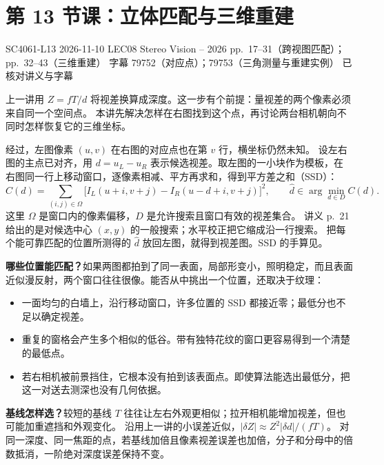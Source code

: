 \section{第 13 节课：立体匹配与三维重建}
\label{lecture:SC4061-L13}

\lecturemeta
  {SC4061-L13}
  {2026-11-10}
  {LEC08 Stereo Vision -- 2026}
  {pp.~17--31（跨视图匹配）；pp.~32--43（三维重建）}
  {字幕 79752（对应点）；79753（三角测量与重建实例）}
  {已核对讲义与字幕}

上一讲用 $Z=fT/d$ 将视差换算成深度。这一步有个前提：量视差的两个像素必须来自同一个空间点。
本讲先解决怎样在右图找到这个点，再讨论两台相机朝向不同时怎样恢复它的三维坐标。


经过，左图像素 $(u,v)$ 在右图的对应点也在第 $v$ 行，横坐标仍然未知。
设左右图的主点已对齐，用 $d=u_L-u_R$ 表示候选视差。取左图的一小块作为模板，在右图同一行上移动窗口，逐像素相减、平方再求和，得到平方差之和（SSD）：
\[
 C(d)=\sum_{(i,j)\in\Omega}
 \big[I_L(u+i,v+j)-I_R(u-d+i,v+j)\big]^2,
 \qquad \hat d\in\arg\min_{d\in D} C(d).
\]
这里 $\Omega$ 是窗口内的像素偏移，$D$ 是允许搜索且窗口有效的视差集合。
讲义 p.~21 给出的是对候选中心 $(x,y)$ 的一般搜索；水平校正把它缩成沿一行搜索。
把每个能可靠匹配的位置所测得的 $\hat d$ 放回左图，就得到视差图。SSD 的手算见。

\textbf{哪些位置能匹配？}如果两图都拍到了同一表面，局部形变小，照明稳定，而且表面近似漫反射，两个窗口往往很像。能否从中挑出一个位置，还取决于纹理：
\begin{itemize}
  \item 一面均匀的白墙上，沿行移动窗口，许多位置的 SSD 都接近零；最低分也不足以确定视差。
  \item 重复的窗格会产生多个相似的低谷。带有独特花纹的窗口更容易得到一个清楚的最低点。
  \item 若右相机被前景挡住，它根本没有拍到该表面点。即使算法能选出最低分，把这一对送去测深也没有几何依据。
\end{itemize}

\textbf{基线怎样选？}较短的基线 $T$ 往往让左右外观更相似；拉开相机能增加视差，但也可能加重遮挡和外观变化。
沿用上一讲的小误差近似，$|\delta Z|\approx Z^2|\delta d|/(fT)$。
对同一深度、同一焦距的点，若基线加倍且像素视差误差也加倍，分子和分母中的倍数抵消，一阶绝对深度误差保持不变。

